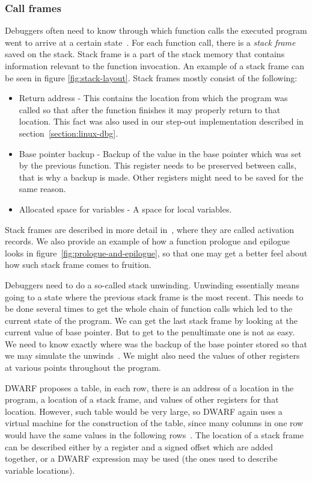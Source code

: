 \subsubsection{Call frames}\label{section:call-frames}
Debuggers often need to know through which function calls the executed program
went to arrive at a certain state~\cite{dwarf}. For each function call, there
is a \textit{stack frame} saved on the stack. Stack frame is a part of the stack memory that
contains information relevant to the function invocation. An example of a
stack frame can be seen in figure \ref{fig:stack-layout}.
Stack frames mostly consist of the following:
\begin{itemize}
    \item Return address - This contains the location from which the program
        was called so that after the function finishes it may properly return
        to that location. This fact was also used in our step-out
        implementation described in section~\ref{section:linux-dbg}.
    \item Base pointer backup - Backup of the value in the base pointer which
        was set by the previous function. This register needs to be preserved
        between calls, that is why a backup is made. Other registers might need
        to be saved for the same reason.
    \item Allocated space for variables - A space for local variables.
\end{itemize}
Stack frames are described in more detail in~\cite{dragon-book}, where they are
called activation records. We also provide an example of how a function
prologue and epilogue looks in figure~\ref{fig:prologue-and-epilogue}, so that
one may get a better feel about how such stack frame comes to fruition.

Debuggers need to do a so-called stack unwinding. Unwinding essentially means
going to a state where the previous stack frame is the most recent. This needs
to be done several times to get the whole chain of function calls which led to
the current state of the program. We can get the last stack frame by looking at
the current value of base pointer. But to get to the penultimate one is not
as easy. We need to know exactly where was the backup of the base pointer
stored so that we may simulate the unwinds~\cite{dwarf}. We might also need the
values of other registers at various points throughout the program.

DWARF proposes a table, in each row, there is an address of a location in the
program, a location of a stack frame, and values of other registers for that
location. However, such table would be very large, so DWARF again uses a
virtual machine for the construction of the table, since many columns in one
row would have the same values in the following rows~\cite{dwarf}. The location
of a stack frame can be described either by a register and a signed offset
which are added together, or a DWARF expression may be used (the ones used to
describe variable locations).

